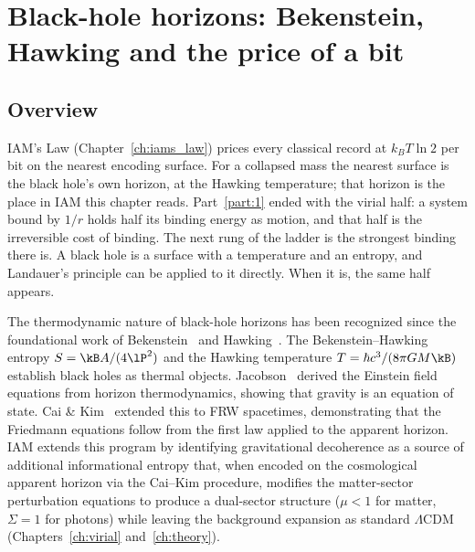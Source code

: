 
\chapter{Black-hole horizons: Bekenstein, Hawking and the price of a bit}\label{ch:blackholes}

\section*{Overview}
IAM's Law (Chapter~\ref{ch:iams_law}) prices every classical record at $k_BT\ln2$ per bit on the nearest encoding surface. For a collapsed
mass the nearest surface is the black hole's own horizon, at the Hawking temperature; that horizon is the place in IAM this chapter reads.
Part~\ref{part:1} ended with the virial half: a system bound by $1/r$ holds half its binding energy as motion, and that half is the irreversible cost of binding. The
next rung of the ladder is the strongest binding there is. A black hole is a surface with a temperature and an entropy, and Landauer's principle can be
applied to it directly. When it is, the same half appears.

The thermodynamic nature of black-hole horizons has been recognized since the foundational work of Bekenstein~\cite{Bekenstein1973} and Hawking~\cite{Hawking1975}. The
Bekenstein--Hawking entropy $S=\kB A/(4\lP^2)$ and the Hawking temperature $T=\hbar c^3/(8\pi GM\kB)$ establish black holes as thermal objects.
Jacobson~\cite{Jacobson1995} derived the Einstein field equations from horizon thermodynamics, showing that gravity is an equation of state. Cai \& Kim~\cite{CaiKim2005}
extended this to FRW spacetimes, demonstrating that the Friedmann equations follow from the first law applied to the apparent horizon. IAM extends this
program by identifying gravitational decoherence as a source of additional informational entropy that, when encoded on the cosmological apparent horizon
via the Cai--Kim procedure, modifies the matter-sector perturbation equations to produce a dual-sector structure ($\mu<1$ for matter, $\Sigma=1$ for photons)
while leaving the background expansion as standard $\Lambda$CDM (Chapters~\ref{ch:virial} and~\ref{ch:theory}).

